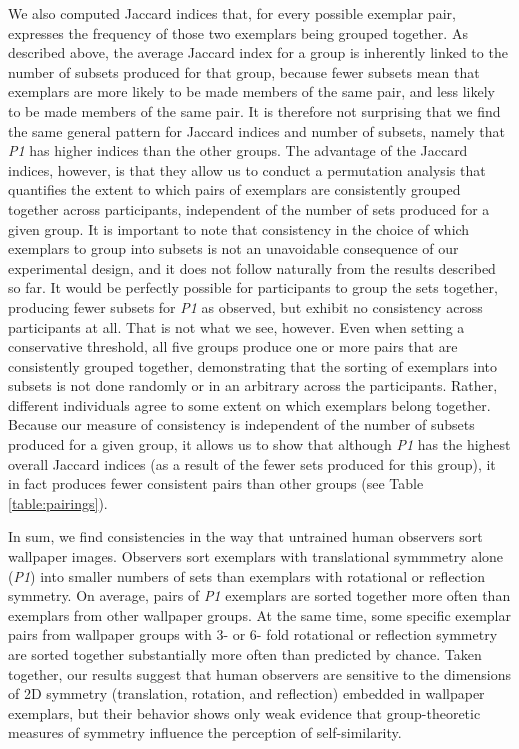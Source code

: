 \documentclass[11pt, twoside]{article}
\begin{document}
We also computed Jaccard indices that, for every possible exemplar pair, expresses the frequency of those two exemplars being grouped together. As described above, the average Jaccard index for a group is inherently linked to the number of subsets produced for that group, because fewer subsets mean that exemplars are more likely to be made members of the same pair, and less likely to be made members of the same pair. It is therefore not surprising that we find the same general pattern for Jaccard indices and number of subsets, namely that \textit{P1} has higher indices than the other groups. The advantage of the Jaccard indices, however, is that they allow us to conduct a permutation analysis that quantifies the extent to which pairs of exemplars are consistently grouped together across participants, independent of the number of sets produced for a given group. It is important to note that consistency in the choice of which exemplars to group into subsets is not an unavoidable consequence of our experimental design, and it does not follow naturally from the results described so far. It would be perfectly possible for participants to group the sets together, producing fewer subsets for \textit{P1} as observed, but exhibit no consistency across participants at all. That is not what we see, however. Even when setting a conservative threshold, all five groups produce one or more pairs that are consistently grouped together, demonstrating that the sorting of exemplars into subsets is not done randomly or in an arbitrary across the participants. Rather, different individuals agree to some extent on which exemplars belong together. Because our measure of consistency is independent of the number of subsets produced for a given group, it allows us to show that although \textit{P1} has the highest overall Jaccard indices (as a result of the fewer sets produced for this group), it in fact produces fewer consistent pairs than other groups (see Table \ref{table:pairings}).

In sum, we find consistencies in the way that untrained human observers sort wallpaper images. Observers sort exemplars with translational symmmetry alone (\textit{P1}) into smaller numbers of sets than exemplars with rotational or reflection symmetry. On average, pairs of \textit{P1} exemplars are sorted together more often than exemplars from other wallpaper groups. At the same time, some specific exemplar pairs from wallpaper groups with 3- or 6- fold rotational or reflection symmetry are sorted together substantially more often than predicted by chance. Taken together, our results suggest that human observers are sensitive to the dimensions of 2D symmetry (translation, rotation, and reflection) embedded in wallpaper exemplars, but their behavior shows only weak evidence that group-theoretic measures of symmetry influence the perception of self-similarity.
\end{document}
